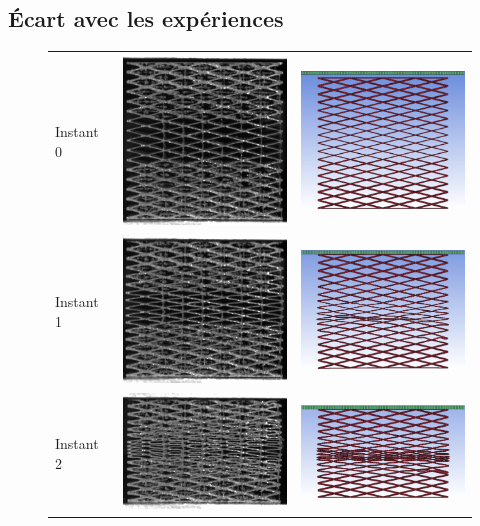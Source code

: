 \documentclass[a4paper]{article}
\begin{document}
	\subsection{Écart avec les expériences}
	\begin{figure}[!h]
		\centering
		\begin{tabular}{m{3cm}m{6cm}m{6cm}}
			Instant 0 & \includegraphics[width=5cm]{Images/8/8_3/exp1.png} & \includegraphics[width=5cm]{Images/8/8_3/ef1.png}\\
			Instant 1 & \includegraphics[width=5cm]{Images/8/8_3/exp2.png} & \includegraphics[width=5cm]{Images/8/8_3/ef2.png}\\
			Instant 2 & \includegraphics[width=5cm]{Images/8/8_3/exp3.png} & \includegraphics[width=5cm]{Images/8/8_3/ef3.png}\\

\end{tabular}
\end{figure}
\end{document}

